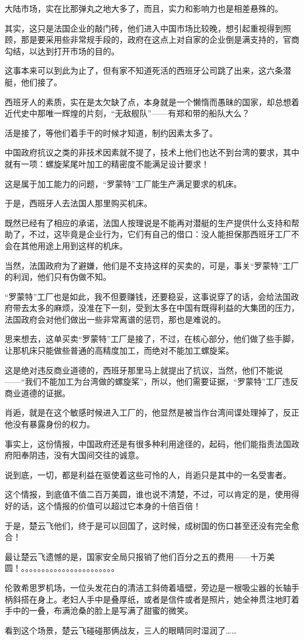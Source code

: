 大陆市场，实在比那弹丸之地大多了，而且，实力和影响力也是相差悬殊的。

其实，这只是法国企业的敲门砖，他们进入中国市场比较晚，想引起重视得到照顾，那是要采用些非常规手段的，政府在这点上对自家的企业倒是满支持的，官商勾结，以达到打开市场的目的。

这事本来可以到此为止了，但有家不知道死活的西班牙公司跳了出来，这六条潜艇，他们接了。

西班牙人的素质，实在是太欠缺了点，本身就是一个懒惰而愚昧的国家，却总想着近代史中那唯一辉煌的片刻，“无敌舰队”——有郑和带的船队大么？

活是接了，等他们着手干的时候才知道，制约因素太多了。

中国政府抗议之类的非技术因素就不提了，技术上他们也达不到台湾的要求，其中就有一项：螺旋桨尾叶加工的精密度不能满足设计要求！

这是属于加工能力的问题，“罗蒙特”工厂能生产满足要求的机床。

于是，西班牙人去法国人那里购买机床。

既然已经有了相应的承诺，法国人按理说是不能再对潜艇的生产提供什么支持和帮助了，不过，这毕竟是企业行为，它们有自己的借口：没人能担保那西班牙工厂不会在其他用途上用到这样的机床。

当然，法国政府为了避嫌，他们是不支持这样的买卖的，可是，事关“罗蒙特”工厂的利润，他们只有伪做不知。

“罗蒙特”工厂也是如此，我不但要赚钱，还要稳妥，这事说穿了的话，会给法国政府带去太多的麻烦，没准在下一刻，受到太多在中国有既得利益的大集团的压力，法国政府会对他们做出一些非常离谱的惩罚，那也是难说的。

思来想去，这单买卖“罗蒙特”工厂是接了，不过，在核心部分，他们做了些手脚，让那机床只能做些普通的高精度加工，而绝对不能加工螺旋桨。

这是绝对违反商业道德的，西班牙那里马上就提出了抗议，当然，他们不能说——“我们不能加工为台湾做的螺旋桨”，所以，他们需要证据，“罗蒙特”工厂违反商业道德的证据。

肖逅，就是在这个敏感时候进入工厂的，他显然是被当作台湾间谍处理掉了，反正他没有暴露身份的权力。

事实上，这份情报，中国政府还是有很多种利用途径的，起码，他们能指责法国政府阳奉阴违，没有大国间交往的诚意。

说到底，一切，都是利益在驱使着这些可怜的人，肖逅只是其中的一名受害者。

这个情报，到底值不值二百万美圆，谁也说不清楚，不过，可以肯定的是，使用得好的话，这个情报的价值可以超过它本身的十倍百倍！

于是，楚云飞他们，终于是可以回国了，这时候，成树国的伤口甚至还没有完全愈合！

最让楚云飞遗憾的是，国家安全局只报销了他们百分之五的费用——十万美圆！。。。。。。。。。。。。。。。。。。。。。。。

伦敦希思罗机场，一位头发花白的清洁工斜倚着墙壁，旁边是一根吸尘器的长轴手柄斜搭在身上。老妇人手中是叠厚纸，或者是信件或者是照片，她全神贯注地盯着手中的一叠，布满沧桑的脸上是写满了甜蜜的微笑。

看到这个场景，楚云飞碰碰那俩战友，三人的眼睛同时湿润了……

